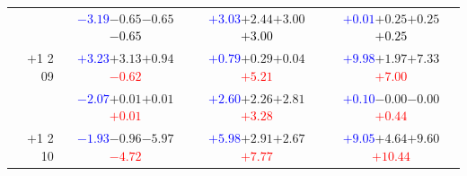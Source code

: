 \documentclass[compress]{beamer}
\begin{document}
\begin{frame}
\begin{tabular}{r | c | c | c}
          & \textcolor{blue}{$-3.19$}\hspace{0.1 cm}$-0.65$\hspace{0.1 cm}$-0.65$\hspace{0.1 cm}\textcolor{black}{$-0.65$} & \textcolor{blue}{$+3.03$}\hspace{0.1 cm}$+2.44$\hspace{0.1 cm}$+3.00$\hspace{0.1 cm}\textcolor{black}{$+3.00$} & \textcolor{blue}{$+0.01$}\hspace{0.1 cm}$+0.25$\hspace{0.1 cm}$+0.25$\hspace{0.1 cm}\textcolor{black}{$+0.25$} \\
$+$1 2 09 & \textcolor{blue}{$+3.23$}\hspace{0.1 cm}$+3.13$\hspace{0.1 cm}$+0.94$\hspace{0.1 cm}\textcolor{red}{$-0.62$} & \textcolor{blue}{$+0.79$}\hspace{0.1 cm}$+0.29$\hspace{0.1 cm}$+0.04$\hspace{0.1 cm}\textcolor{red}{$+5.21$} & \textcolor{blue}{$+9.98$}\hspace{0.1 cm}$+1.97$\hspace{0.1 cm}$+7.33$\hspace{0.1 cm}\textcolor{red}{$+7.00$} \\
          & \textcolor{blue}{$-2.07$}\hspace{0.1 cm}$+0.01$\hspace{0.1 cm}$+0.01$\hspace{0.1 cm}\textcolor{red}{$+0.01$} & \textcolor{blue}{$+2.60$}\hspace{0.1 cm}$+2.26$\hspace{0.1 cm}$+2.81$\hspace{0.1 cm}\textcolor{red}{$+3.28$} & \textcolor{blue}{$+0.10$}\hspace{0.1 cm}$-0.00$\hspace{0.1 cm}$-0.00$\hspace{0.1 cm}\textcolor{red}{$+0.44$} \\
$+$1 2 10 & \textcolor{blue}{$-1.93$}\hspace{0.1 cm}$-0.96$\hspace{0.1 cm}$-5.97$\hspace{0.1 cm}\textcolor{red}{$-4.72$} & \textcolor{blue}{$+5.98$}\hspace{0.1 cm}$+2.91$\hspace{0.1 cm}$+2.67$\hspace{0.1 cm}\textcolor{red}{$+7.77$} & \textcolor{blue}{$+9.05$}\hspace{0.1 cm}$+4.64$\hspace{0.1 cm}$+9.60$\hspace{0.1 cm}\textcolor{red}{$+10.44$} \\

\end{tabular}
\end{frame}
\end{document}
